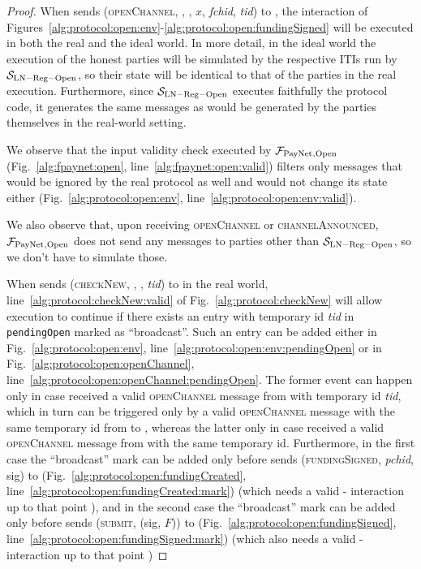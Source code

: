 \begin{proof}
  When \environment{} sends (\textsc{openChannel}, \alice, \bob, $x$,
  \textit{fchid}, \textit{tid}) to \alice, the interaction of
  Figures~\ref{alg:protocol:open:env}-\ref{alg:protocol:open:fundingSigned}
  will be executed in both the real and the ideal world. In more detail, in
  the ideal world the execution of the honest parties will be simulated by the
  respective ITIs run by $\mathcal{S}_{\mathrm{LN - Reg - Open}}$, so their
  state will be identical to that of the parties in the real execution.
  Furthermore, since $\mathcal{S}_{\mathrm{LN - Reg - Open}}$ executes
  faithfully the protocol code, it generates the same messages as would be
  generated by the parties themselves in the real-world setting.

  We observe that the input validity check executed by $\mathcal{F}_{\mathrm{PayNet}}{}_{\mathrm{,
  Open}}$ (Fig.~\ref{alg:fpaynet:open}, line~\ref{alg:fpaynet:open:valid})
  filters only messages that would be ignored by the real protocol as well and
  would not change its state either (Fig.~\ref{alg:protocol:open:env},
  line~\ref{alg:protocol:open:env:valid}).

  We also observe that, upon receiving \textsc{openChannel} or
  \textsc{channelAnnounced}, $\mathcal{F}_{\mathrm{PayNet}}{}_{\mathrm{, Open}}$ does not send any
  messages to parties other than $\mathcal{S}_{\mathrm{LN - Reg - Open}}$, so
  we don't have to simulate those.

  When \environment{} sends (\textsc{checkNew}, \alice, \bob, \textit{tid}) to
  \alice{} in the real world, line~\ref{alg:protocol:checkNew:valid} of
  Fig.~\ref{alg:protocol:checkNew} will allow execution to continue if there
  exists an entry with temporary id \textit{tid} in \texttt{pendingOpen}
  marked as ``broadcast''. Such an entry can be added either in
  Fig.~\ref{alg:protocol:open:env},
  line~\ref{alg:protocol:open:env:pendingOpen} or in
  Fig.~\ref{alg:protocol:open:openChannel},
  line~\ref{alg:protocol:open:openChannel:pendingOpen}. The former event can
  happen only in case \alice{} received a valid \textsc{openChannel} message
  from \bob{} with temporary id \textit{tid}, which in turn can be triggered
  only by a valid \textsc{openChannel} message with the same temporary id from
  \environment{} to \bob{}, whereas the latter only in case \alice{} received
  a valid \textsc{openChannel} message from \environment{} with the same
  temporary id. Furthermore, in the first case the ``broadcast'' mark can be
  added only before \alice{} sends (\textsc{fundingSigned}, \textit{pchid},
  sig) to \bob{} (Fig.~\ref{alg:protocol:open:fundingCreated},
  line~\ref{alg:protocol:open:fundingCreated:mark}) (which needs a valid
  \alice-\bob{} interaction up to that point ), and in
  the second case the ``broadcast'' mark can be added only before \alice{}
  sends (\textsc{submit}, (sig, $F$)) to \ledger{}
  (Fig.~\ref{alg:protocol:open:fundingSigned},
  line~\ref{alg:protocol:open:fundingSigned:mark}) (which also needs a valid
  \alice-\bob{} interaction up to that point )


\end{proof}
